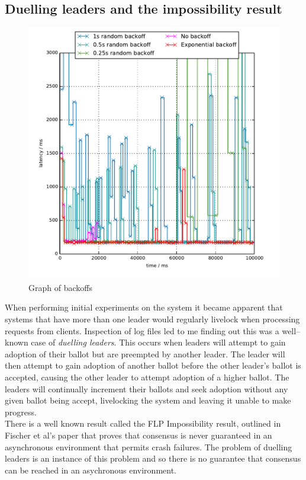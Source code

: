\subsection{Duelling leaders and the impossibility result}

\begin{figure}
  \includegraphics{include/backoffs.pdf}
  \caption{Graph of backoffs}
  \label{fig:backoff-graph}
\end{figure}

When performing initial experiments on the system it became apparent that systems that have more than one leader would regularly livelock when processing requests from clients. Inspection of log files led to me finding out this was a well--known case of \emph{duelling leaders}. This occurs when leaders will attempt to gain adoption of their ballot but are preempted by another leader. The leader will then attempt to gain adoption of another ballot before the other leader's ballot is accepted, causing the other leader to attempt adoption of a higher ballot. The leaders will continually increment their ballots and seek adoption without any given ballot being accept, livelocking the system and leaving it unable to make progress. \\

There is a well known result called the FLP Impossibility result, outlined in Fischer et al's paper \cite{Fischer:1985:IDC:3149.214121} that proves that consensus is never guaranteed in an asynchronous environment that permits crash failures. The problem of duelling leaders is an instance of this problem and so there is no guarantee that consensus can be reached in an asychronous environment. \\

